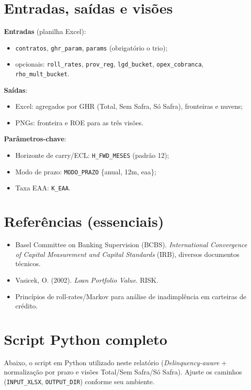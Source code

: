 \documentclass[11pt,a4paper]{article}
\newcommand{\1}{\mathbf{1}}
\begin{document}
\section{Entradas, saídas e visões}
\textbf{Entradas} (planilha Excel):
\begin{itemize}[noitemsep]
  \item \texttt{contratos}, \texttt{ghr\_param}, \texttt{params} (obrigatório o trio);
  \item opcionais: \texttt{roll\_rates}, \texttt{prov\_reg}, \texttt{lgd\_bucket}, \texttt{opex\_cobranca}, \texttt{rho\_mult\_bucket}.
\end{itemize}
\textbf{Saídas}:
\begin{itemize}[noitemsep]
  \item Excel: agregados por GHR (Total, Sem Safra, Só Safra), fronteiras e nuvens;
  \item PNGs: fronteira e ROE para as três visões.
\end{itemize}
\textbf{Parâmetros-chave}:
\begin{itemize}[noitemsep]
  \item Horizonte de carry/ECL: \texttt{H\_FWD\_MESES} (padrão 12);
  \item Modo de prazo: \texttt{MODO\_PRAZO} \{anual, 12m, eaa\};
  \item Taxa EAA: \texttt{K\_EAA}.
\end{itemize}

\section*{Referências (essenciais)}
\begin{itemize}[noitemsep]
  \item Basel Committee on Banking Supervision (BCBS). \emph{International Convergence of Capital Measurement and Capital Standards} (IRB), diversos documentos técnicos.
  \item Vasicek, O. (2002). \emph{Loan Portfolio Value}. RISK.
  \item Princípios de roll-rates/Markov para análise de inadimplência em carteiras de crédito.
\end{itemize}

\clearpage
\appendix
\section{Script Python completo}
\noindent Abaixo, o script em Python utilizado neste relatório (\emph{Delinquency-aware} + normalização por prazo e visões Total/Sem Safra/Só Safra). Ajuste os caminhos (\texttt{INPUT\_XLSX}, \texttt{OUTPUT\_DIR}) conforme seu ambiente.
\end{document}
